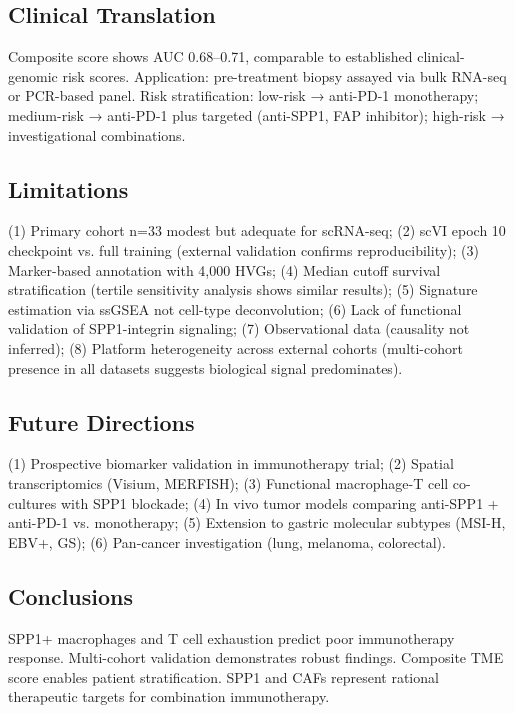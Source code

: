 \documentclass[12pt,twoside]{article}
\begin{document}
\subsection{Clinical Translation}

Composite score shows AUC 0.68--0.71, comparable to established clinical-genomic risk scores. Application: pre-treatment biopsy assayed via bulk RNA-seq or PCR-based panel. Risk stratification: low-risk → anti-PD-1 monotherapy; medium-risk → anti-PD-1 plus targeted (anti-SPP1, FAP inhibitor); high-risk → investigational combinations.

\subsection{Limitations}

(1) Primary cohort n=33 modest but adequate for scRNA-seq; (2) scVI epoch 10 checkpoint vs. full training (external validation confirms reproducibility); (3) Marker-based annotation with 4,000 HVGs; (4) Median cutoff survival stratification (tertile sensitivity analysis shows similar results); (5) Signature estimation via ssGSEA not cell-type deconvolution; (6) Lack of functional validation of SPP1-integrin signaling; (7) Observational data (causality not inferred); (8) Platform heterogeneity across external cohorts (multi-cohort presence in all datasets suggests biological signal predominates).

\subsection{Future Directions}

(1) Prospective biomarker validation in immunotherapy trial; (2) Spatial transcriptomics (Visium, MERFISH); (3) Functional macrophage-T cell co-cultures with SPP1 blockade; (4) In vivo tumor models comparing anti-SPP1 + anti-PD-1 vs. monotherapy; (5) Extension to gastric molecular subtypes (MSI-H, EBV+, GS); (6) Pan-cancer investigation (lung, melanoma, colorectal).

\subsection{Conclusions}

SPP1+ macrophages and T cell exhaustion predict poor immunotherapy response. Multi-cohort validation demonstrates robust findings. Composite TME score enables patient stratification. SPP1 and CAFs represent rational therapeutic targets for combination immunotherapy.
\end{document}
